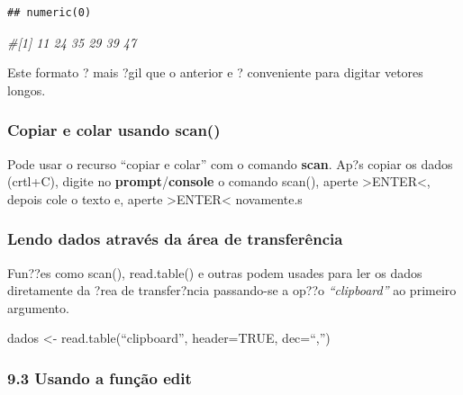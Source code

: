 \documentclass[]{book}
\newenvironment{Shaded}{\begin{snugshade}}{\end{snugshade}}
\newcommand{\CommentTok}[1]{\textcolor[rgb]{0.56,0.35,0.01}{\textit{#1}}}
\newcommand{\KeywordTok}[1]{\textcolor[rgb]{0.13,0.29,0.53}{\textbf{#1}}}
\newcommand{\NormalTok}[1]{#1}
\newcommand{\StringTok}[1]{\textcolor[rgb]{0.31,0.60,0.02}{#1}}
\begin{document}
\begin{Shaded}
\end{Shaded}

\begin{verbatim}
## numeric(0)
\end{verbatim}

\begin{Shaded}
\begin{Highlighting}[]
\CommentTok{#[1] 11 24 35 29 39 47}
\end{Highlighting}
\end{Shaded}

Este formato ? mais ?gil que o anterior e ? conveniente para digitar vetores longos.

\hypertarget{copiar-e-colar-usando-scan}{%
\subsubsection{Copiar e colar usando scan()}\label{copiar-e-colar-usando-scan}}

Pode usar o recurso ``copiar e colar'' com o comando \textbf{scan}.
Ap?s copiar os dados (crtl+C), digite no \textbf{prompt}/\textbf{console} o comando scan(), aperte \textgreater{}ENTER\textless{}, depois cole o texto e, aperte \textgreater{}ENTER\textless{} novamente.s

\hypertarget{lendo-dados-atraves-da-area-de-transferencia}{%
\subsubsection{Lendo dados através da área de transferência}\label{lendo-dados-atraves-da-area-de-transferencia}}

Fun??es como scan(), read.table() e outras podem usades para ler os dados diretamente da ?rea de transfer?ncia passando-se a op??o \emph{``clipboard''} ao primeiro argumento.

dados \textless{}- read.table(``clipboard'', header=TRUE, dec=``,'')

\hypertarget{usando-a-funcao-edit}{%
\subsubsection{9.3 Usando a função edit}\label{usando-a-funcao-edit}}
\end{document}
